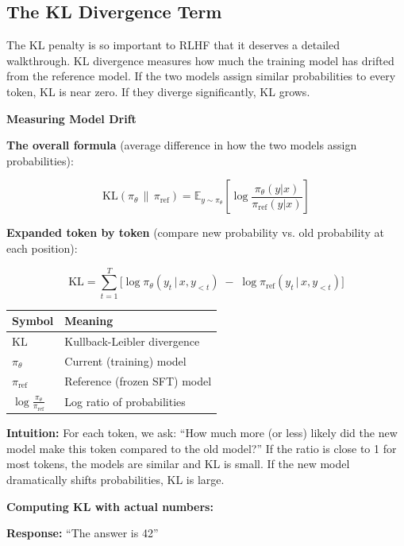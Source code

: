 \begin{chapterenv}
\subsection{The KL Divergence Term}

The KL penalty is so important to RLHF that it deserves a detailed walkthrough. KL divergence measures how much the training model has drifted from the reference model. If the two models assign similar probabilities to every token, KL is near zero. If they diverge significantly, KL grows.

\begin{infobox}
\textbf{Measuring Model Drift}

\textbf{The overall formula} (average difference in how the two models assign probabilities):

$$\text{KL}(\pi_\theta \,\|\, \pi_{\text{ref}}) = \mathbb{E}_{y \sim \pi_\theta}\!\left[\log \frac{\pi_\theta(y|x)}{\pi_{\text{ref}}(y|x)}\right]$$

\textbf{Expanded token by token} (compare new probability vs. old probability at each position):

$$\text{KL} = \sum_{t=1}^T \Big[\log \pi_\theta(y_t \,|\, x, y_{<t}) \;-\; \log \pi_{\text{ref}}(y_t \,|\, x, y_{<t})\Big]$$

\begin{center}
\begin{tabular}{p{}p{}}
\toprule
\textbf{Symbol} & \textbf{Meaning} \\
\midrule
$\text{KL}$ & Kullback-Leibler divergence \\
$\pi_\theta$ & Current (training) model \\
$\pi_{\text{ref}}$ & Reference (frozen SFT) model \\
$\log \frac{\pi_\theta}{\pi_{\text{ref}}}$ & Log ratio of probabilities \\
\bottomrule
\end{tabular}
\end{center}

\textbf{Intuition:} For each token, we ask: ``How much more (or less) likely did the new model make this token compared to the old model?'' If the ratio is close to 1 for most tokens, the models are similar and KL is small. If the new model dramatically shifts probabilities, KL is large.
\end{infobox}

\textbf{Computing KL with actual numbers:}

\textbf{Response:} ``The answer is 42''


\end{chapterenv}

